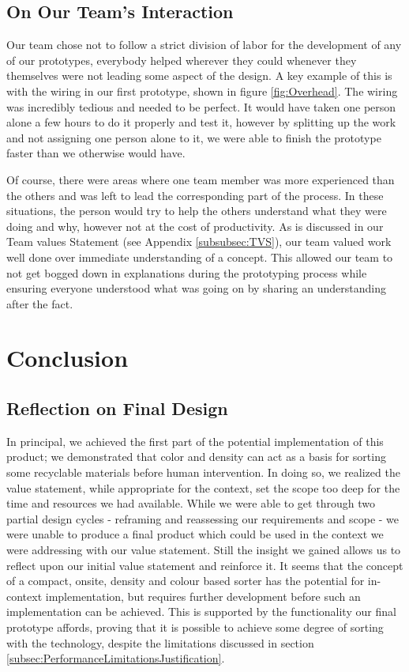 \documentclass[12pt]{article}
\begin{document}
\begin{multicols*}{2}
        \subsection{On Our Team's Interaction}
            Our team chose not to follow a strict division of labor for the development of any of our prototypes, everybody helped wherever they could whenever they themselves were not leading some aspect of the design. A key example of this is with the wiring in our first prototype, shown in figure \ref{fig:Overhead}. The wiring was incredibly tedious and needed to be perfect. It would have taken one person alone a few hours to do it properly and test it, however by splitting up the work and not assigning one person alone to it, we were able to finish the prototype faster than we otherwise would have. 

            Of course, there were areas where one team member was more experienced than the others and was left to lead the corresponding part of the process. In these situations, the person would try to help the others understand what they were doing and why, however not at the cost of productivity. As is discussed in our Team values Statement (see Appendix \ref{subsubsec:TVS}), our team valued work well done over immediate understanding of a concept. This allowed our team to not get bogged down in explanations during the prototyping process while ensuring everyone understood what was going on by sharing an understanding after the fact.

    \section{Conclusion}
        \subsection{Reflection on Final Design}
            In principal, we achieved the first part of the potential implementation of this product; we demonstrated that color and density can act as a basis for sorting some recyclable materials before human intervention. In doing so, we realized the value statement, while appropriate for the context, set the scope too deep for the time and resources we had available. While we were able to get through two partial design cycles - reframing and reassessing our requirements and scope - we were unable to produce a final product which could be used in the context we were addressing with our value statement. Still the insight we gained allows us to reflect upon our initial value statement and reinforce it. It seems that the concept of a compact, onsite, density and colour based sorter has the potential for in-context implementation, but requires further development before such an implementation can be achieved. This is supported by the functionality our final prototype affords, proving that it is possible to achieve some degree of sorting with the technology, despite the limitations discussed in section \ref{subsec:PerformanceLimitationsJustification}.


\end{multicols*}
\end{document}
